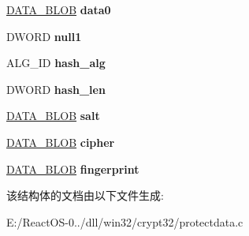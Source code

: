 \begin{DoxyCompactItemize}
\hyperlink{struct___c_r_y_p_t_o_a_p_i___b_l_o_b}{D\+A\+T\+A\+\_\+\+B\+L\+OB} {\bfseries data0}
\item 
\mbox{\label{structprotect__data__t_af983ec7148c437dbc822efc2d0de39e1}} 
D\+W\+O\+RD {\bfseries null1}
\item 
\mbox{\label{structprotect__data__t_a4562a3bdfa4a4e93422a4b5cfc6c4ef9}} 
A\+L\+G\+\_\+\+ID {\bfseries hash\+\_\+alg}
\item 
\mbox{\label{structprotect__data__t_a8203964d8793f07b9ae0ca0e06fc312b}} 
D\+W\+O\+RD {\bfseries hash\+\_\+len}
\item 
\mbox{\label{structprotect__data__t_a5e39006cdb763c5407e448bd83c2b7b6}} 
\hyperlink{struct___c_r_y_p_t_o_a_p_i___b_l_o_b}{D\+A\+T\+A\+\_\+\+B\+L\+OB} {\bfseries salt}
\item 
\mbox{\label{structprotect__data__t_a439548658fd72bda27abff966b0b3a83}} 
\hyperlink{struct___c_r_y_p_t_o_a_p_i___b_l_o_b}{D\+A\+T\+A\+\_\+\+B\+L\+OB} {\bfseries cipher}
\item 
\mbox{\label{structprotect__data__t_a6483685e54246ae3e95171a615efb567}} 
\hyperlink{struct___c_r_y_p_t_o_a_p_i___b_l_o_b}{D\+A\+T\+A\+\_\+\+B\+L\+OB} {\bfseries fingerprint}
\end{DoxyCompactItemize}


该结构体的文档由以下文件生成\+:\begin{DoxyCompactItemize}
\item 
E\+:/\+React\+O\+S-\/0../dll/win32/crypt32/protectdata.\+c\end{DoxyCompactItemize}
